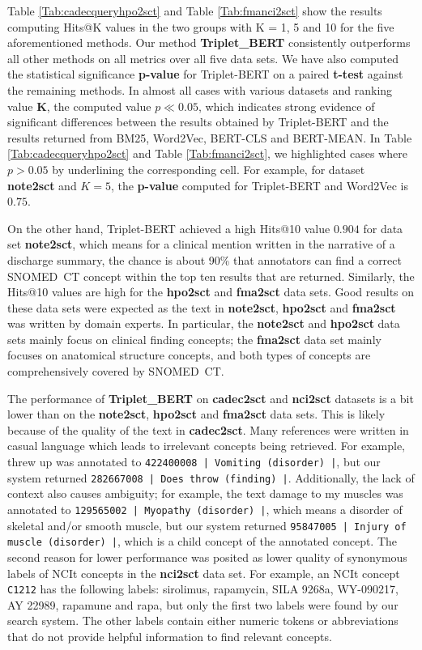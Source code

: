 \documentclass[preprint,12pt]{elsarticle}
\begin{document}
Table \ref{Tab:cadecqueryhpo2sct} and Table \ref{Tab:fmanci2sct} show the results computing Hits@K values in the two groups with K = 1, 5 and 10 for the five aforementioned methods. Our method \textbf{Triplet\_BERT} consistently outperforms all other methods on all metrics over all five data sets. We have also computed the statistical significance \textbf{p-value} for Triplet-BERT on a paired \textbf{t-test} against the remaining methods. In almost all cases with various datasets and ranking value \textbf{K}, the computed value $p \ll 0.05$, which indicates strong evidence of significant differences between the results obtained by Triplet-BERT and the results returned from BM25, Word2Vec, BERT-CLS and BERT-MEAN. In Table \ref{Tab:cadecqueryhpo2sct} and Table \ref{Tab:fmanci2sct}, we highlighted cases where $p > 0.05$ by underlining the corresponding cell. For example, for dataset \textbf{note2sct} and $K=5$, the \textbf{p-value} computed for Triplet-BERT and Word2Vec is $0.75$. 

On the other hand, Triplet-BERT achieved a high Hits@10 value $0.904$ for data set \textbf{note2sct}, which means for a clinical mention written in the narrative of a discharge summary, the chance is about 90\% that annotators can find a correct SNOMED~CT concept within the top ten results that are returned. Similarly, the Hits@10 values are high for the \textbf{hpo2sct} and \textbf{fma2sct} data sets. Good results on these data sets were expected as the text in \textbf{note2sct}, \textbf{hpo2sct} and \textbf{fma2sct} was written by domain experts. In particular, the \textbf{note2sct} and \textbf{hpo2sct} data sets mainly focus on clinical finding concepts; the \textbf{fma2sct} data set mainly focuses on anatomical structure concepts, and both types of concepts are comprehensively covered by SNOMED~CT. 

The performance of \textbf{Triplet\_BERT } on \textbf{cadec2sct} and \textbf{nci2sct} datasets is a bit lower than on the \textbf{note2sct}, \textbf{hpo2sct} and \textbf{fma2sct} data sets. This is likely because of the quality of the text in \textbf{cadec2sct}. Many references were written in casual language which leads to irrelevant concepts being retrieved. For example, {threw up} was annotated to \texttt{422400008 | Vomiting (disorder) |}, but our system returned \texttt{282667008 | Does throw (finding) |}. Additionally, the lack of context also causes ambiguity; for example, the text {damage to my muscles} was annotated to \texttt{129565002 | Myopathy (disorder) |}, which means a disorder of skeletal and/or smooth muscle, but our system returned \texttt{95847005 | Injury of muscle (disorder) |}, which is a child concept of the annotated concept. 
The second reason for lower performance was posited as lower quality of synonymous labels of NCIt concepts in the \textbf{nci2sct} data set. For example, an NCIt concept \texttt{C1212} has the following labels: {sirolimus}, {rapamycin},  {SILA 9268a}, {WY-090217}, {AY 22989}, {rapamune} and {rapa}, but only the first two labels were found by our search system. The other labels contain either numeric tokens or abbreviations that do not provide helpful information to find relevant concepts.
\end{document}
